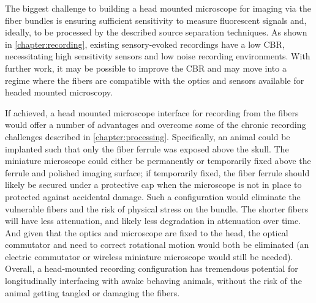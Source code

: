 The biggest challenge to building a head 
mounted microscope for imaging via the fiber 
bundles is ensuring sufficient sensitivity 
to measure fluorescent signals and, ideally,
to be processed by the described source 
separation techniques. As shown in 
\cref{chapter:recording}, existing 
sensory-evoked recordings have a low 
CBR, necessitating high sensitivity sensors 
and low noise recording environments. With 
further work, it may be possible to improve 
the CBR and may move into a regime where the 
fibers are compatible with the optics and 
sensors available for headed mounted microscopy.

If achieved, a head mounted microscope interface 
for recording from the fibers would offer a number 
of advantages and overcome some of the chronic 
recording challenges described in 
\cref{chapter:processing}. Specifically, an animal 
could be implanted such that only the fiber ferrule 
was exposed above the skull. The miniature 
microscope could either be permanently or temporarily 
fixed above the ferrule and polished imaging surface; 
if temporarily fixed, the fiber ferrule should likely 
be secured under a protective cap when the microscope 
is not in place to protected against accidental 
damage. Such a configuration would eliminate the 
vulnerable fibers and the risk of physical stress on 
the bundle. The shorter fibers will have less 
attenuation, and likely less degradation in attenuation 
over time. And given that the optics and microscope 
are fixed to the head, the optical commutator and 
need to correct rotational motion would both be 
eliminated (an electric commutator or wireless miniature 
microscope would still be needed). Overall, a head-mounted 
recording configuration has tremendous potential for 
longitudinally interfacing with awake behaving animals, 
without the risk of the animal getting tangled or 
damaging the fibers.

